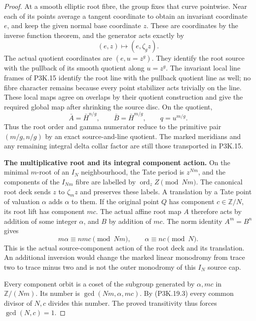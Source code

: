 \begin{proof}
At a smooth elliptic root fibre, the group fixes that curve
pointwise.  Near each of its points average a tangent
coordinate to obtain an invariant coordinate \(e\), and
keep the given normal base coordinate \(z\).  These are
coordinates by the inverse function theorem, and the
generator acts exactly by
\[
                         (e,z)\longmapsto(e,\zeta_g z).
\]
The actual quotient coordinates are \((e,u=z^g)\).
They identify the root source with the pullback of its
smooth quotient along \(u=z^g\).  The invariant local
line frames of P3K.15 identify the root line with the
pullback quotient line as well; no fibre character remains
because every point stabilizer acts trivially on the line.
These local maps agree on overlaps by their quotient
construction and give the required global map after
shrinking the source disc.  On the quotient,
\[
  \bar A=\bar H^{n/g},\qquad
  \bar B=\bar H^{m/g},\qquad
  q=u^{m/g}.
\]
Thus the root order and gamma numerator reduce to the
primitive pair \((m/g,n/g)\) by an exact source-and-line
quotient.  The marked meridians and any remaining integral
delta collar factor are still those transported in P3K.15.

\par\medskip\noindent\textbf{The multiplicative root and its integral component action.}\enspace
On the minimal \(m\)-root of an \(I_N\) neighbourhood,
the Tate period is \(z^{Nm}\), and the components of
the \(I_{Nm}\) fibre are labelled by
\(\operatorname{ord}_z Z\pmod{Nm}\).  The canonical
root deck sends \(z\) to \(\zeta_m z\) and preserves
these labels.  A translation by a Tate point of valuation
\(\alpha\) adds \(\alpha\) to them.  If the original
point \(Q\) has component \(c\in\mathbb Z/N\), its
root lift has component \(mc\).  The actual affine
root map \(A\) therefore acts by addition of some
integer \(\alpha\), and \(B\) by addition of \(mc\).
The norm identity \(A^m=B^n\) gives
\[
       m\alpha\equiv nmc\pmod{Nm},\qquad
                   \alpha\equiv nc\pmod N.          \tag{P3K.19.3}
\]
This is the actual source-component action of the root
deck and its translation.  An additional inversion would
change the marked linear monodromy from trace two to
trace minus two and is not the outer monodromy of this
\(I_N\) source cap.

Every component orbit is a coset of the subgroup generated
by \(\alpha,mc\) in \(\mathbb Z/(Nm)\).  Its number
is \(\gcd(Nm,\alpha,mc)\).  By (P3K.19.3) every
common divisor of \(N,c\) divides this number.  The
proved transitivity thus forces \(\gcd(N,c)=1\).


\end{proof}
